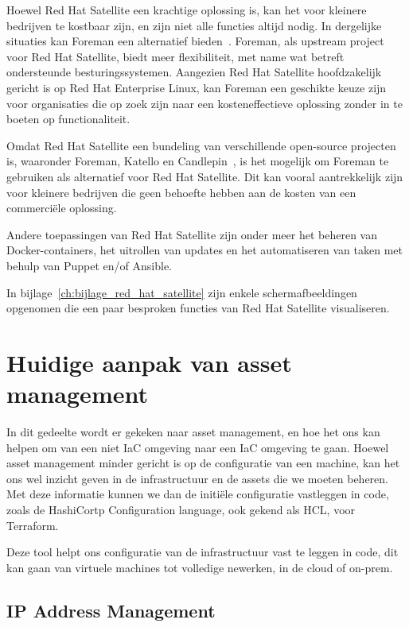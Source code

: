 Hoewel Red Hat Satellite een krachtige oplossing is, kan het voor kleinere bedrijven te kostbaar zijn, en zijn niet alle functies altijd nodig.
In dergelijke situaties kan Foreman een alternatief bieden~\autocite{foreman-introduction}.
Foreman, als upstream project voor Red Hat Satellite, biedt meer flexibiliteit, met name wat betreft ondersteunde besturingssystemen.
Aangezien Red Hat Satellite hoofdzakelijk gericht is op Red Hat Enterprise Linux, kan Foreman een geschikte keuze zijn voor organisaties die op zoek zijn naar een kosteneffectieve oplossing zonder in te boeten op functionaliteit.

Omdat Red Hat Satellite een bundeling van verschillende open-source projecten is, waaronder Foreman, Katello en Candlepin~\autocite{rhel-satellite-6-introduction}, is het mogelijk om Foreman te gebruiken als alternatief voor Red Hat Satellite.
Dit kan vooral aantrekkelijk zijn voor kleinere bedrijven die geen behoefte hebben aan de kosten van een commerciële oplossing.

Andere toepassingen van Red Hat Satellite zijn onder meer het beheren van Docker-containers, het uitrollen van updates en het automatiseren van taken met behulp van Puppet en/of Ansible.

In bijlage~\ref{ch:bijlage_red_hat_satellite} zijn enkele schermafbeeldingen opgenomen die een paar besproken functies van Red Hat Satellite visualiseren.

\section{Huidige aanpak van asset management}%
\label{sec:huidige-aanpak-van-asset-management}

In dit gedeelte wordt er gekeken naar asset management, en hoe het ons kan helpen om van een niet IaC omgeving naar een IaC omgeving te gaan.
Hoewel asset management minder gericht is op de configuratie van een machine, kan het ons wel inzicht geven in de infrastructuur en de assets die we moeten beheren.
Met deze informatie kunnen we dan de initi\"ele configuratie vastleggen in code, zoals de HashiCortp Configuration language, ook gekend als HCL, voor Terraform.

Deze tool helpt ons configuratie van de infrastructuur vast te leggen in code, dit kan gaan van virtuele machines tot volledige newerken, in de cloud of on-prem.

\subsection{IP Address Management}
\label{sub:ipam}

